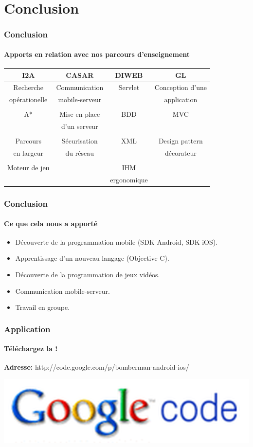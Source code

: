 \section{Conclusion}

\begin{frame}
\frametitle{Conclusion}
\framesubtitle{Apports en relation avec nos parcours d'enseignement}
\begin{tabular}{c|c|c|c}

I2A & CASAR & DIWEB & GL \\\hline
Recherche   &  Communication  &  Servlet  & Conception d'une  \\
 opérationelle  & mobile-serveur &   & application \\
                           &                              &                &                   \\
A* & Mise en place  & BDD & MVC \\
      &d'un serveur & & \\
                           &                              &                &                   \\
Parcours  &  Sécurisation   & XML  & Design pattern  \\
en largeur & du réseau & & décorateur \\

                           &                              &                &                   \\

Moteur de jeu & & IHM  & \\
           &           &        ergonomique        &        \\

\end{tabular}

\end{frame}



\begin{frame}
\frametitle{Conclusion}
\framesubtitle{Ce que cela nous a apporté}
\begin{itemize}
	\item Découverte de la programmation mobile (SDK Android, SDK iOS).
	\item Apprentissage d'un nouveau langage (Objective-C).
	\item Découverte de la programmation de jeux vidéos.
	\item Communication mobile-serveur.
	\item Travail en groupe.
\end{itemize}
\end{frame}


\begin{frame}
\frametitle{Application}
\framesubtitle{Téléchargez la  !}
\begin{center}\textbf{Adresse:} http://code.google.com/p/bomberman-android-ios/\end{center}
\begin{center}\includegraphics[scale=0.2]{img/googleCode.png}\end{center}
\end{frame}
